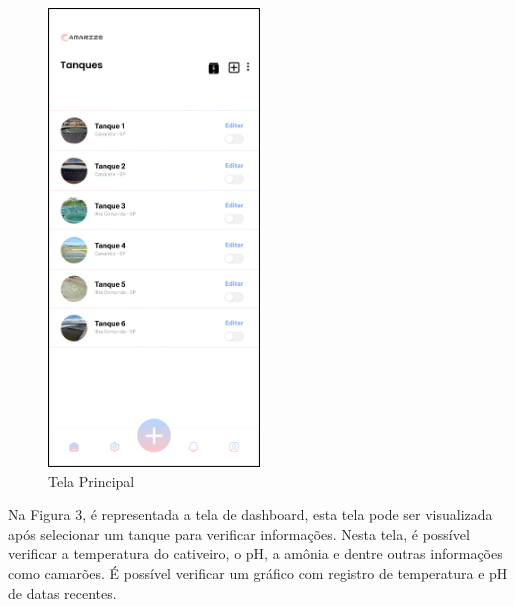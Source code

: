 \begin{figure}[!htb]
\centering
{}
\caption{Tela Principal}%
\label{fig:tela-principal}
\includegraphics[width = 0.5\textwidth]{Imagem/Lista_Tanques.png}
\end{figure}

\newpage

Na Figura 3, é representada a tela de dashboard, esta tela pode ser visualizada após selecionar um tanque para verificar informações. Nesta tela, é possível verificar a temperatura do cativeiro, o pH, a amônia e dentre outras informações como camarões. É possível verificar um gráfico com registro de temperatura e pH de datas recentes.

